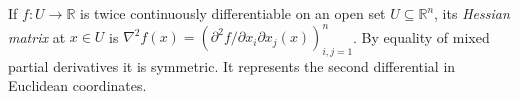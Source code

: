 
If $f:U\to\mathbb R$ is twice continuously differentiable on an open set $U\subseteq\mathbb R^n$, its \emph{Hessian matrix} at $x\in U$ is $\nabla^2f(x)=(\partial^2 f/\partial x_i\partial x_j(x))_{i,j=1}^n$. By equality of mixed partial derivatives it is symmetric. It represents the second differential in Euclidean coordinates.
